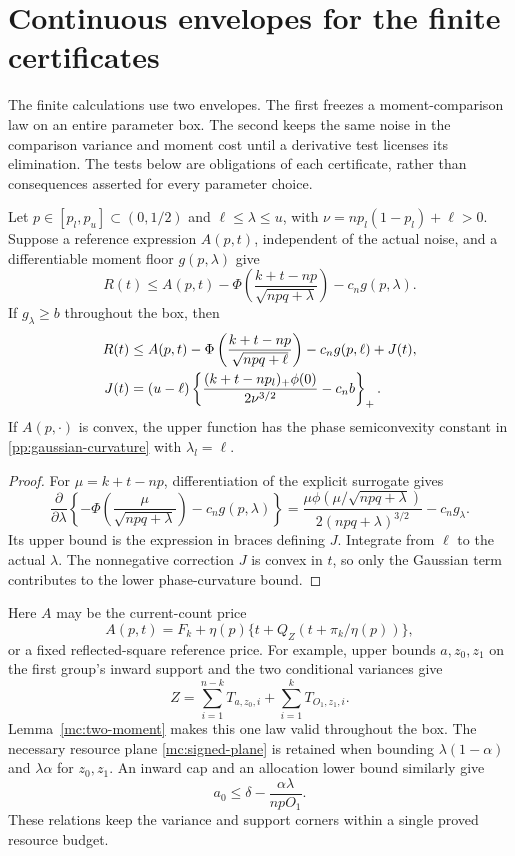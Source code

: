 \section{Continuous envelopes for the finite certificates}\label{ce:section}

The finite calculations use two envelopes. The first freezes a
moment-comparison law on an entire parameter box. The second keeps the
same noise in the comparison variance and moment cost until a derivative
test licenses its elimination. The tests below are obligations of each
certificate, rather than consequences asserted for every parameter choice.

\begin{proposition}\label{ce:fixed-box}
Let $p\in[p_l,p_u]\subset(0,1/2)$ and $\ell\le\lambda\le u$, with
$\nu=np_l(1-p_l)+\ell>0$. Suppose a reference expression $A(p,t)$,
independent of the actual noise, and a differentiable moment floor
$g(p,\lambda)$ give
\[
 R(t)\le A(p,t)-\Phi\left(\frac{k+t-np}{\sqrt{npq+\lambda}}\right)
                      -c_ng(p,\lambda).
\]
If $g_\lambda\ge b$ throughout the box, then
\begin{align}\label{ce:fixed-box-bound}
 R(t)\le{}&A(p,t)-\Phi\left(\frac{k+t-np}{\sqrt{npq+\ell}}\right)
                      -c_ng(p,\ell)+J(t),\\
 J(t)={}&(u-\ell)
 \left\{\frac{(k+t-np_l)_+\phi(0)}{2\nu^{3/2}}-c_nb\right\}_+.
 \notag
\end{align}
If $A(p,\cdot)$ is convex, the upper function has the phase
semiconvexity constant in \eqref{pp:gaussian-curvature} with
$\lambda_l=\ell$.
\end{proposition}
\begin{proof}
For $\mu=k+t-np$, differentiation of the explicit surrogate gives
\[
 \frac\partial{\partial\lambda}
 \left\{-\Phi\left(\frac\mu{\sqrt{npq+\lambda}}\right)-c_ng(p,\lambda)\right\}
 =\frac{\mu\phi(\mu/\sqrt{npq+\lambda})}{2(npq+\lambda)^{3/2}}
                           -c_ng_\lambda.
\]
Its upper bound is the expression in braces defining $J$.
Integrate from $\ell$ to the actual $\lambda$. The nonnegative
correction $J$ is convex in $t$, so only the Gaussian term contributes
to the lower phase-curvature bound.
\end{proof}

Here $A$ may be the current-count price
\[
 A(p,t)=F_k+\eta(p)\{t+Q_Z(t+\pi_k/\eta(p))\},
\]
or a fixed reflected-square reference price. For example, upper bounds
$a,z_0,z_1$ on the first group's inward support and the two conditional
variances give
\[
 Z=\sum_{i=1}^{n-k}T_{a,z_0,i}+\sum_{i=1}^{k}T_{O_1,z_1,i}.
\]
Lemma~\ref{mc:two-moment} makes this one law valid throughout the box.
The necessary resource plane \eqref{mc:signed-plane} is retained when
bounding $\lambda(1-\alpha)$ and $\lambda\alpha$ for $z_0,z_1$.
An inward cap and an allocation lower bound similarly give
\[
 a_0\le\delta-\frac{\alpha\lambda}{npO_1}.
\]
These relations keep the variance and support corners within a single
proved resource budget.


